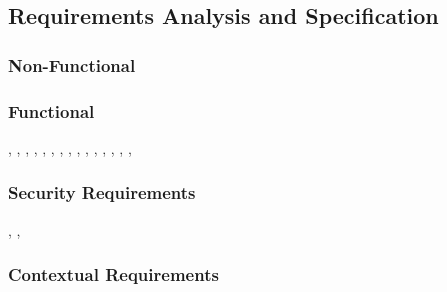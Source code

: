 \subsection{Requirements Analysis and Specification}

\subsubsection{Non-Functional}

\cite{Slankas:2013}

\subsubsection{Functional}

\cite{Deocadez:2017}, \cite{Kurtanovic:2017}, \cite{Guzman:2017},
\cite{Abad:2017}, \cite{Dekhtyar:2017}, \cite{Rashwan:2012}, \cite{Lu:2017},
\cite{Hayes:2014}, \cite{Williams:2017}, \cite{Garzoli:2013},
\cite{Casamayor:2010}, \cite{Wang:2016}, \cite{Hussain:2012}, \cite{Jiang:2014},
\cite{Jha:2017}, \cite{Pinquie:2015}

\subsubsection{Security Requirements} 

\cite{Jildal:2016}, \cite{Riaz:2014}, \cite{Knauss:2014} 

\subsubsection{Contextual Requirements} 

